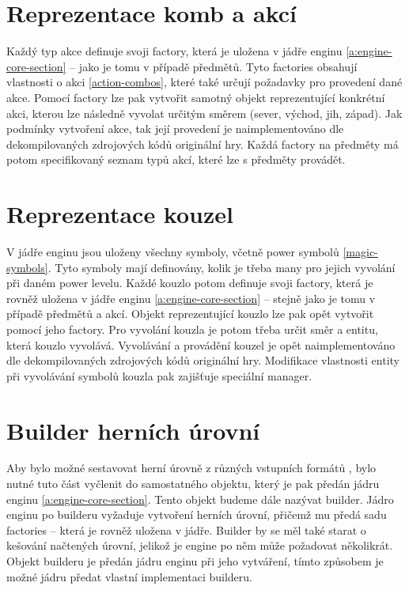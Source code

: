 \section{Reprezentace komb a akcí}

Každý typ akce definuje svoji factory, která je uložena v jádře enginu \vref{a:engine-core-section} -- jako je tomu v případě předmětů.
Tyto factories obsahují vlastnosti o akci \vref{action-combos}, které také určují požadavky pro provedení dané akce.
Pomocí factory lze pak vytvořit samotný objekt reprezentující konkrétní akci, kterou lze následně vyvolat určitým 
směrem (sever, východ, jih, západ). Jak podmínky vytvoření akce, tak její provedení je naimplementováno dle dekompilovaných
zdrojových kódů \cite{DMDecompilation} originální hry. Každá factory na předměty má potom specifikovaný seznam typů akcí,
které lze s předměty provádět.

\section{Reprezentace kouzel}

V jádře enginu jsou uloženy všechny symboly, včetně power symbolů \vref{magic-symbols}.
Tyto symboly mají definovány, kolik je třeba many pro jejich vyvolání při daném power levelu.
Každé kouzlo potom definuje svoji factory, která je rovněž uložena v jádře enginu \vref{a:engine-core-section} -- stejně jako je tomu v případě předmětů a akcí.
Objekt reprezentující kouzlo lze pak opět vytvořit pomocí jeho factory. Pro vyvolání kouzla je potom třeba určit směr a entitu,
která kouzlo vyvolává. Vyvolávání a provádění kouzel je opět naimplementováno dle dekompilovaných
zdrojových kódů \cite{DMDecompilation} originální hry. Modifikace vlastnosti entity při vyvolávání symbolů
kouzla pak zajišťuje speciální manager. 

\section{Builder herních úrovní}

Aby bylo možné sestavovat herní úrovně z různých vstupních formátů , bylo nutné tuto část vyčlenit do samostatného
objektu, který je pak předán jádru enginu \vref{a:engine-core-section}. Tento objekt budeme dále nazývat builder. Jádro enginu
po builderu vyžaduje vytvoření herních úrovní, přičemž mu předá sadu factories -- která je rovněž uložena v jádře. Builder
by se měl také starat o kešování načtených úrovní, jelikož je engine po něm může požadovat několikrát. Objekt builderu
je předán jádru enginu při jeho vytváření, tímto způsobem je možné jádru předat vlastní implementaci builderu.

